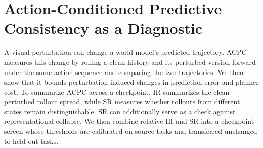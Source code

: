 \documentclass{article}
\begin{document}

\section{Action-Conditioned Predictive Consistency as a Diagnostic}\label{sec:acpc}

A visual perturbation can change a world model's predicted trajectory.
ACPC measures this change by rolling a clean history and its perturbed version
forward under the same action sequence and comparing the two trajectories. We then show that it bounds
perturbation-induced changes in prediction error and planner cost. To summarize ACPC across a checkpoint, IR summarizes the clean--perturbed rollout spread, while SR measures whether rollouts from different states remain distinguishable. SR can additionally serve as a check against representational collapse. We then combine relative IR and SR into a checkpoint screen whose thresholds are calibrated on source tasks and transferred unchanged to held-out tasks.
\end{document}
